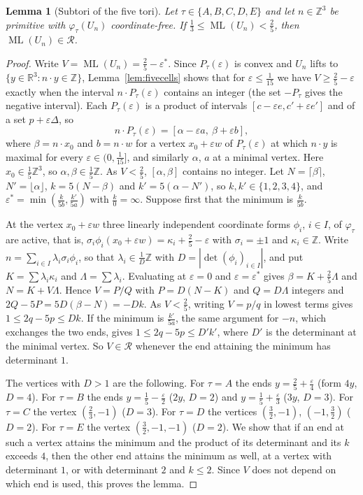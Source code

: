 \documentclass[12pt]{amsart}
\newtheorem{lemma}[theorem]{Lemma}
\theoremstyle{definition}\newtheorem{definition}[theorem]{Definition}
\theoremstyle{remark}\newtheorem{remark}[theorem]{Remark}
\newcommand{\Z}{\mathbb Z}\newcommand{\R}{\mathbb R}\newcommand{\T}{\mathbb T}
\newcommand{\ML}{\operatorname{ML}}
\begin{document}
\begin{lemma}[Subtori of the five tori]\label{lem:five}
Let $\tau\in\{A,B,C,D,E\}$ and let $n\in\Z^3$ be primitive with $\varphi_\tau(U_n)$ coordinate-free. If $\frac13\le\ML(U_n)<\frac25$, then $\ML(U_n)\in\mathcal R$.
\end{lemma}
\begin{proof}
Write $V=\ML(U_n)=\frac25-\varepsilon^*$. Since $P_\tau(\varepsilon)$ is convex and $U_n$ lifts to $\{y\in\R^3:n\cdot y\in\Z\}$, Lemma~\ref{lem:fivecells} shows that for $\varepsilon\le\frac1{15}$ we have $V\ge\frac25-\varepsilon$ exactly when the interval $n\cdot P_\tau(\varepsilon)$ contains an integer (the set $-P_\tau$ gives the negative interval). Each $P_\tau(\varepsilon)$ is a product of intervals $[c-\varepsilon e,c'+\varepsilon e']$ and of a set $p+\varepsilon\Delta$, so
\[
 n\cdot P_\tau(\varepsilon)=[\alpha-\varepsilon a,\ \beta+\varepsilon b],
\]
where $\beta=n\cdot x_0$ and $b=n\cdot w$ for a vertex $x_0+\varepsilon w$ of $P_\tau(\varepsilon)$ at which $n\cdot y$ is maximal for every $\varepsilon\in(0,\frac1{15}]$, and similarly $\alpha$, $a$ at a minimal vertex. Here $x_0\in\frac15\Z^3$, so $\alpha,\beta\in\frac15\Z$. As $V<\frac25$, $[\alpha,\beta]$ contains no integer. Let $N=\lceil\beta\rceil$, $N'=\lfloor\alpha\rfloor$, $k=5(N-\beta)$ and $k'=5(\alpha-N')$, so $k,k'\in\{1,2,3,4\}$, and $\varepsilon^*=\min(\frac k{5b},\frac{k'}{5a})$ with $\frac k0=\infty$. Suppose first that the minimum is $\frac k{5b}$.

At the vertex $x_0+\varepsilon w$ three linearly independent coordinate forms $\phi_i$, $i\in I$, of $\varphi_\tau$ are active, that is, $\sigma_i\phi_i(x_0+\varepsilon w)=\kappa_i+\frac25-\varepsilon$ with $\sigma_i=\pm1$ and $\kappa_i\in\Z$. Write $n=\sum_{i\in I}\lambda_i\sigma_i\phi_i$, so that $\lambda_i\in\frac1D\Z$ with $D=|\det(\phi_i)_{i\in I}|$, and put $K=\sum\lambda_i\kappa_i$ and $\Lambda=\sum\lambda_i$. Evaluating at $\varepsilon=0$ and $\varepsilon=\varepsilon^*$ gives $\beta=K+\frac25\Lambda$ and $N=K+V\Lambda$. Hence $V=P/Q$ with $P=D(N-K)$ and $Q=D\Lambda$ integers and $2Q-5P=5D(\beta-N)=-Dk$. As $V<\frac25$, writing $V=p/q$ in lowest terms gives $1\le2q-5p\le Dk$. If the minimum is $\frac{k'}{5a}$, the same argument for $-n$, which exchanges the two ends, gives $1\le2q-5p\le D'k'$, where $D'$ is the determinant at the minimal vertex. So $V\in\mathcal R$ whenever the end attaining the minimum has determinant $1$.

The vertices with $D>1$ are the following. For $\tau=A$ the ends $y=\frac25+\frac\varepsilon4$ (form $4y$, $D=4$). For $\tau=B$ the ends $y=\frac15-\frac\varepsilon2$ ($2y$, $D=2$) and $y=\frac15+\frac\varepsilon3$ ($3y$, $D=3$). For $\tau=C$ the vertex $(\frac23,-1)$ ($D=3$). For $\tau=D$ the vertices $(\frac32,-1)$, $(-1,\frac32)$ ($D=2$). For $\tau=E$ the vertex $(\frac32,-1,-1)$ ($D=2$). We show that if an end at such a vertex attains the minimum and the product of its determinant and its $k$ exceeds $4$, then the other end attains the minimum as well, at a vertex with determinant $1$, or with determinant $2$ and $k\le2$. Since $V$ does not depend on which end is used, this proves the lemma.


\end{proof}
\end{document}
